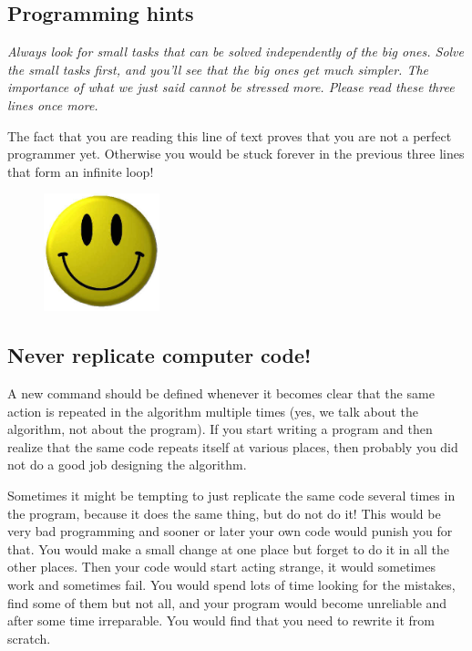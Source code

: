 {{{{\subsection{Programming hints}

{\em Always look for small tasks that can be solved independently of the big ones.
Solve the small tasks first, and you'll see that the big ones get much simpler. The 
importance of what we just said cannot be stressed more. Please read these three 
lines once more.}

\newpage
\noindent
The fact that you are reading this line of text proves that you are not 
a perfect programmer yet. Otherwise you would be stuck forever in the 
previous three lines that form an infinite loop!

\begin{figure}[!ht]
\begin{center}
\includegraphics[width=0.3\textwidth]{imgk/smiley.png}
\end{center}
\vspace{-1cm}
\end{figure}

\subsection{Never replicate computer code!}

A new command should be defined whenever it becomes clear that the same 
action is repeated in the algorithm multiple times (yes, we talk about the algorithm,
not about the program). If you start writing a program and then realize that the same
code repeats itself at various places, then probably you did not do a good job 
designing the algorithm.

Sometimes it might be 
tempting to just replicate the same code several times in the 
program, because it does the same thing, but do not do it! This would be very bad programming
and sooner or later your own code would punish you for that. 
You would make a small change at one place but forget to do it 
in all the other places. Then your code would start 
acting strange, it would sometimes work and sometimes fail. 
You would spend lots of time looking for the mistakes, find some 
of them but not all, and your program would become unreliable
and after some time irreparable. You would find that you need to 
rewrite it from scratch.

}}}}
